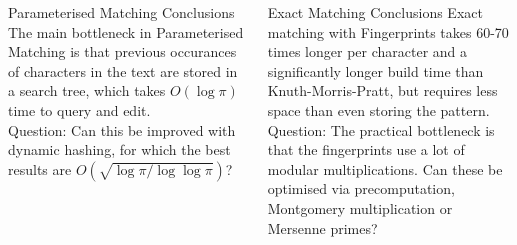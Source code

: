 \documentclass[ %
                    author={Dominic Moylett},
                supervisor={Dr. Raphael Clifford, Dr. Markus Jalsenius and Dr. Benjamin Sach},
                     title={An Empirical Analysis of Data Streaming Algorithms},
                  subtitle={},
                    degree={MEng},
                      year={2014} ]{poster}
\begin{document}
\begin{frame}{}
\begin{columns}[t]
  \begin{column}{0.422\linewidth}
  \begin{block}{\Large Parameterised Matching Conclusions}
  The main bottleneck in Parameterised Matching is that previous occurances of characters in the text are stored in a search tree, which takes $O(\log\pi)$ time to query and edit.\\
  \vspace{\baselineskip}
  Question: Can this be improved with dynamic hashing, for which the best results are $O(\sqrt{\log\pi/\log\log\pi})$?
  \end{block}
  \end{column}
  \begin{column}{0.422\linewidth}
  \begin{block}{\Large Exact Matching Conclusions}
  Exact matching with Fingerprints takes 60-70 times longer per character and a significantly longer build time than Knuth-Morris-Pratt, but requires less space than even storing the pattern.\\
  \vspace{\baselineskip}
  Question: The practical bottleneck is that the fingerprints use a lot of modular multiplications. Can these be optimised via precomputation, Montgomery multiplication or Mersenne primes?
  \end{block}
  \end{column}
\end{columns}

\vfill

\end{frame}

\end{document}
